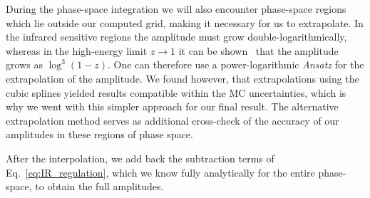 During the phase-space integration we will also encounter phase-space regions which lie outside our computed grid, making it necessary for us to extrapolate. In the infrared sensitive regions the amplitude must grow double-logarithmically, whereas in the high-energy limit $z \rightarrow 1$ it can be shown~\cite{Marzani:2008az, Harlander:2009my} that the amplitude grows as $\log^3(1 - z)$. One can therefore use a power-logarithmic \textit{Ansatz} for the extrapolation of the amplitude. We found however, that extrapolations using the cubic splines yielded results compatible within the \acs{MC} uncertainties, which is why we went with this simpler approach for our final result. The alternative extrapolation method serves as additional cross-check of the accuracy of our amplitudes in these regions of phase space.

After the interpolation, we add back the subtraction terms of Eq.~\eqref{eq:IR_regulation}, which we know fully analytically for the entire phase-space, to obtain the full amplitudes.

